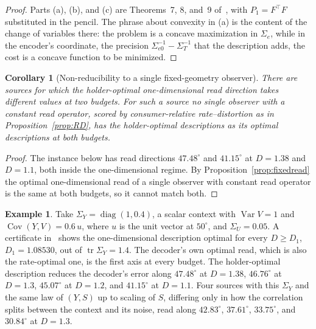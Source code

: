 \documentclass[11pt]{article}
\newtheorem{corollary}{Corollary}
\theoremstyle{definition}
\newtheorem{example}{Example}
\theoremstyle{remark}
\newcommand{\tr}{\operatorname{tr}}
\newcommand{\Cov}{\operatorname{Cov}}
\begin{document}
\begin{proof}
Parts (a), (b), and (c) are Theorems~7, 8, and~9 of~\cite{bond2026vector}, with $P_{1}=F^{\top}F$ substituted in the pencil.
The phrase about convexity in (a) is the content of the change of variables there: the problem is a concave maximization in $\Sigma_{e}$, while in the encoder's coordinate, the precision $\Sigma_{e0}^{-1}-\Sigma_{T}^{-1}$ that the description adds, the cost is a concave function to be minimized.
\end{proof}

\begin{corollary}[Non-reducibility to a single fixed-geometry observer]
\label{cor:twoobs}
There are sources for which the holder-optimal one-dimensional read direction takes different values at two budgets.
For such a source no single observer with a constant read operator, scored by consumer-relative rate--distortion as in Proposition~\ref{prop:RD}, has the holder-optimal descriptions as its optimal descriptions at both budgets.
\end{corollary}

\begin{proof}
The instance below has read directions $47.48^{\circ}$ and $41.15^{\circ}$ at $D=1.38$ and $D=1.1$, both inside the one-dimensional regime.
By Proposition~\ref{prop:fixedread} the optimal one-dimensional read of a single observer with constant read operator is the same at both budgets, so it cannot match both.
\end{proof}

\begin{example}
Take $\Sigma_{Y}=\operatorname{diag}(1,0.4)$, a scalar context with $\operatorname{Var}V=1$ and $\Cov(Y,V)=0.6\,u$, where $u$ is the unit vector at $50^{\circ}$, and $\Sigma_{U}=0.05$.
A certificate in~\cite{bond2026vector} shows the one-dimensional description optimal for every $D\ge D_1$, $D_1=1.08530$, out of $\tr\Sigma_{Y}=1.4$.
The decoder's own optimal read, which is also the rate-optimal one, is the first axis at every budget.
The holder-optimal description reduces the decoder's error along $47.48^{\circ}$ at $D=1.38$, $46.76^{\circ}$ at $D=1.3$, $45.07^{\circ}$ at $D=1.2$, and $41.15^{\circ}$ at $D=1.1$.
Four sources with this $\Sigma_{Y}$ and the same law of $(Y,S)$ up to scaling of $S$, differing only in how the correlation splits between the context and its noise, read along $42.83^{\circ}$, $37.61^{\circ}$, $33.75^{\circ}$, and $30.84^{\circ}$ at $D=1.3$.
\end{example}
\end{document}
